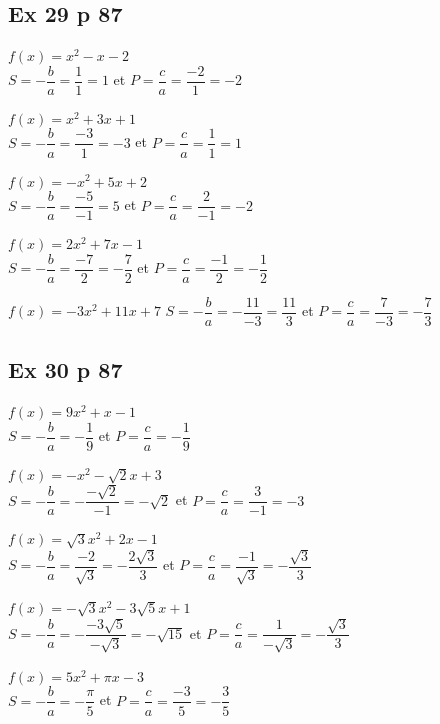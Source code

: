 \documentclass[12pt,a4paper]{book}
\begin{document}
\subsection*{Ex 29 p 87}

\begin{enumMet}
    \item $f(x)=x^{2}-x-2$\\
    $S=-\dfrac{b}{a}=\dfrac{1}{1}=1$ et $P=\dfrac{c}{a}=\dfrac{-2}{1}=-2$
    \item $f(x)=x^{2}+3 x+1$\\
    $S=-\dfrac{b}{a}=\dfrac{-3}{1}=-3$ et $P=\dfrac{c}{a}=\dfrac{1}{1}=1$
    \item $f(x)=-x^{2}+5 x+2$\\
    $S=-\dfrac{b}{a}=\dfrac{-5}{-1}=5$ et $P=\dfrac{c}{a}=\dfrac{2}{-1}=-2$
    \item $f(x)=2 x^{2}+7 x-1$\\
    $S=-\dfrac{b}{a}=\dfrac{-7}{2}=-\dfrac{7}{2}$ et $P=\dfrac{c}{a}=\dfrac{-1}{2}=-\dfrac{1}{2}$
    \item $f(x)=-3 x^{2}+11 x+7$
    $S=-\dfrac{b}{a}=-\dfrac{11}{-3}=\dfrac{11}{3}$ et $P=\dfrac{c}{a}=\dfrac{7}{-3}=-\dfrac{7}{3}$
\end{enumMet}

\subsection*{Ex 30 p 87}

\begin{enumMet}
    \item $f(x)=9x^{2}+x-1$\\
    $S=-\dfrac{b}{a}=-\dfrac{1}{9}$ et $P=\dfrac{c}{a}=-\dfrac{1}{9}$
    \item $f(x)=-x^{2}-\sqrt{2} x+3$\\
    $S=-\dfrac{b}{a}=-\dfrac{-\sqrt{2}}{-1}=-\sqrt{2}$ et $P=\dfrac{c}{a}=\dfrac{3}{-1}=-3$
    \item $f(x)=\sqrt{3}x^{2}+2 x-1$\\
    $S=-\dfrac{b}{a}=\dfrac{-2}{\sqrt{3}}=-\dfrac{2\sqrt{3}}{3}$ et $P=\dfrac{c}{a}=\dfrac{-1}{\sqrt{3}}=-\dfrac{\sqrt{3}}{3}$
    \item $f(x)=-\sqrt{3}x^{2}-3\sqrt{5}x+1$\\
    $S=-\dfrac{b}{a}=-\dfrac{-3\sqrt{5}}{-\sqrt{3}}=-\sqrt{15}$ et $P=\dfrac{c}{a}=\dfrac{1}{-\sqrt{3}}=-\dfrac{\sqrt{3}}{3}$
    \item $f(x)=5x^{2}+\pi x-3$\\
    $S=-\dfrac{b}{a}=-\dfrac{\pi}{5}$ et $P=\dfrac{c}{a}=\dfrac{-3}{5}=-\dfrac{3}{5}$
\end{enumMet}
\end{document}
